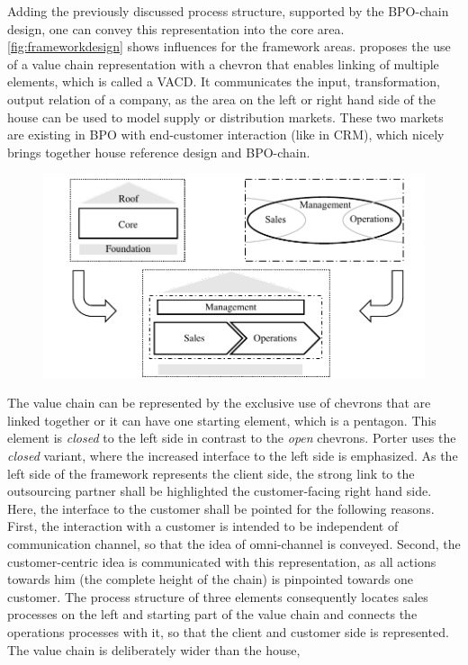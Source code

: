	Adding the previously discussed process structure, supported by the BPO-chain design, one can convey this representation into the core area. \Fig \ref{fig:frameworkdesign} shows influences for the framework areas. 
	\citeauthor{Meise2001} proposes the use of a value chain representation with a chevron that enables linking of multiple elements, which is called a \acrfull{VACD}. It communicates the input, transformation, output relation of a company, as the area on the left or right hand side of the house can be used to model supply or distribution markets. 
	These two markets are existing in BPO with end-customer interaction (like in \acrshort{CRM}), which nicely brings together house reference design and \acrshort{BPO}-chain. 
	
	\begin{figure}[caption={Framework design influences}, label={fig:frameworkdesign}]
		{	\includegraphics[width=.8\textwidth]{figures/frameworkdesign.pdf}}
	\end{figure} 
	
	
	The value chain can be represented by the exclusive use of chevrons that are linked together or it can have one starting element, which is a pentagon. This element is \textit{closed} to the left side in contrast to the \textit{open} chevrons. Porter uses the \textit{closed} variant, where the increased interface to the left side is emphasized. As the left side of the framework represents the client side, the strong link to the outsourcing partner shall be highlighted \wrt the customer-facing right hand side. Here, the interface to the customer shall be pointed for the following reasons. First, the interaction with a customer is intended to be independent of communication channel, so that the idea of omni-channel is conveyed. Second, the customer-centric idea is communicated with this representation, as all actions towards him (the complete height of the chain) is pinpointed towards one customer. The process structure of three elements consequently locates sales processes on the left and starting part of the value chain and connects the operations processes with it, so that the client and customer side is represented. The value chain is deliberately wider than the house, 
	
